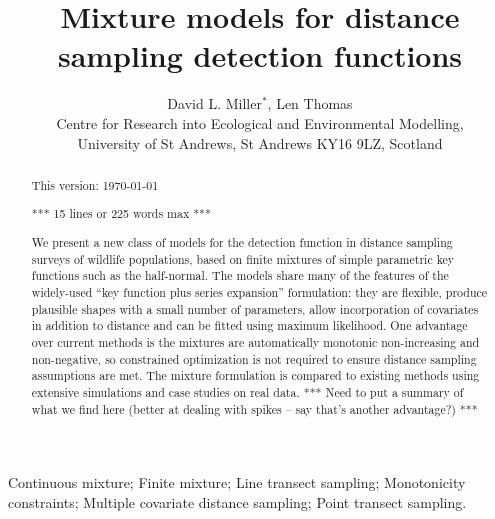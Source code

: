 \documentclass[useAMS,referee,usenatbib]{biom}
\title[Mixture model detection functions]{Mixture models for distance sampling detection functions}
\author{David L. Miller$^{*}$\email{dave@ninepointeightone.net}, Len Thomas\\
Centre for Research into Ecological and Environmental Modelling,\\
University of St Andrews, St Andrews KY16 9LZ, Scotland}
\begin{document}
\label{firstpage}

\begin{abstract}
This version: \today %

*** 15 lines or 225 words max ***

We present a new class of models for the detection function in distance sampling surveys of wildlife populations, based on finite mixtures of simple parametric key functions such as the half-normal. The models share many of the features of the widely-used ``key function plus series expansion'' formulation: they are flexible, produce plausible shapes with a small number of parameters, allow incorporation of covariates in addition to distance and can be fitted using maximum likelihood. One advantage over current methods is the mixtures are automatically monotonic non-increasing and non-negative, so constrained optimization is not required to ensure distance sampling assumptions are met. The mixture formulation is compared to existing methods using extensive simulations and case studies on real data. *** Need to put a summary of what we find here (better at dealing with spikes -- say that's another advantage?) ***
\end{abstract}

\begin{keywords}
Continuous mixture; Finite mixture; Line transect sampling; Monotonicity constraints; Multiple covariate distance sampling; Point transect sampling.
\end{keywords}

\maketitle



%
\end{document}
